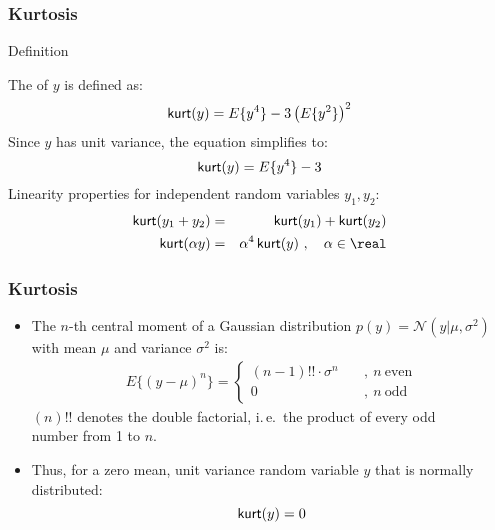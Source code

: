 \begin{frame}
  \frametitle{Kurtosis}

  \begin{citeblock}{Definition}
 
   The  of $y$ is defined as:
    \begin{displaymath}
      \mathop{\mathsf{kurt}}(y) = E \{ y^4 \} - 3 \left( E\{ y^2 \} \right)^2
    \end{displaymath}
    \pause
%    
    Since $y$ has unit variance, the equation simplifies to:
    \begin{displaymath}
      \mathop{\mathsf{kurt}}(y) = E \{ y^4 \} - 3
    \end{displaymath}
    \pause 
%    
    Linearity properties for independent random variables $y_1, y_2$:
    \begin{eqnarray*}
      \kurt(y_1 + y_2) &=& \kurt(y_1) + \kurt(y_2) \\
      \kurt(\alpha y) &=& \alpha^4 \kurt(y) ~, \quad \alpha \in \real
    \end{eqnarray*}
  \end{citeblock}
\end{frame}


\begin{frame}
  \frametitle{Kurtosis \cont}

  
  \begin{itemize}
    \item The $n$-th central moment of a Gaussian distribution $p(y) = {\mathcal{N}}(y | \mu, \sigma^2)$ with mean $\mu$ and variance $\sigma^2$ is:
      \begin{eqnarray*}
        E \{ (y - \mu)^n \} = \begin{cases}
                                (n-1) !! \cdot \sigma^n \quad &, ~n~ \mbox{even} \\
                                0 \quad &, ~n~ \mbox{odd}
                              \end{cases}
      \end{eqnarray*}
      $(n)!!$ denotes the double factorial, i.\,e.\ the product of every odd \\ 
      \hspace{0.85cm} number from 1 to $n$. \pause
    \item Thus, for a zero mean, unit variance random variable $y$ that is normally distributed:
      \begin{displaymath}
        \mathop{\mathsf{kurt}}(y) = 0
      \end{displaymath}
  \end{itemize}
\end{frame}


